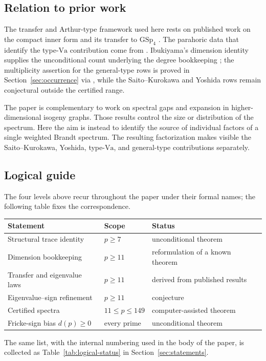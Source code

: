 \documentclass[10pt,a4paper]{amsart}
\newcommand{\GSp}{\mathrm{GSp}}
\begin{document}
	\subsection{Relation to prior work}\label{ss:relation-prior}
	
	The transfer and Arthur-type framework used here rests on published work on
	the compact inner form and its transfer to $\GSp_4$
	\cite{RoesnerWeissauer2021,vanHoften,DPRT,Schmidt2018}. The parahoric data
	that identify the type-$\mathrm{Va}$ contribution come from
	\cite[Table~A.15]{RobertsSchmidt}. Ibukiyama's dimension identity supplies
	the unconditional count underlying the degree bookkeeping
	\cite[Thm.~3.1]{Ibukiyama2018conj}; the multiplicity assertion for the
	general-type rows is proved in Section~\ref{sec:occurrence} via
	\cite[Thm.~11.4]{RoesnerWeissauer2021}, while the Saito--Kurokawa and
	Yoshida rows remain conjectural outside the certified range.
	
	The paper is complementary to work on spectral gaps and expansion in
	higher-dimensional isogeny graphs. Those results control the size or
	distribution of the spectrum. Here the aim is instead to identify the
	source of individual factors of a single weighted Brandt spectrum. The
	resulting factorization makes visible the Saito--Kurokawa, Yoshida,
	type-$\mathrm{Va}$, and general-type contributions separately.
	
	\subsection{Logical guide}\label{ss:logical-guide}
	The four levels above recur throughout the paper under their formal names; the following table fixes the correspondence.
	
	\begin{center}
		\begin{tabular}{lll}
			\toprule
			Statement & Scope & Status \\
			\midrule
			Structural trace identity & $p\ge7$ & unconditional theorem \\
			Dimension bookkeeping & $p\ge11$ & reformulation of a known theorem \\
			Transfer and eigenvalue laws & $p\ge11$ & derived from published results \\
			Eigenvalue--sign refinement & $p\ge11$ & conjecture \\
			Certified spectra & $11\le p\le149$ & computer-assisted theorem \\
			Fricke-sign bias $d(p)\ge0$ & every prime & unconditional theorem \\
			\bottomrule
		\end{tabular}
	\end{center}
	The same list, with the internal numbering used in the body of the paper,
	is collected as Table~\ref{tab:logical-status} in
	Section~\ref{sec:statements}.
	
\end{document}
